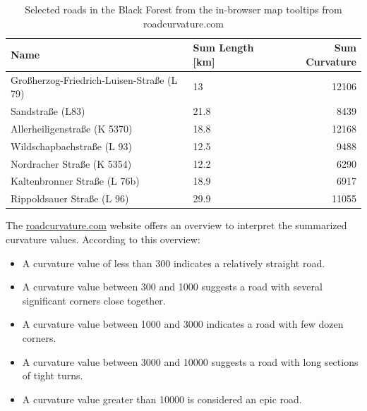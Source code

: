     \begin{table}
    \centering
    \begin{tabular}{@{}llr@{}} \toprule
        Name                                      & Sum Length [km] & Sum Curvature \\ \midrule
        Großherzog-Friedrich-Luisen-Straße (L 79) & 13              & 12106         \\
        Sandstraße (L83)                          & 21.8            & 8439          \\
        Allerheiligenstraße (K 5370)              & 18.8            & 12168         \\
        Wildschapbachstraße (L 93)                & 12.5            & 9488          \\
        Nordracher Straße (K 5354)                & 12.2            & 6290          \\
        Kaltenbronner Straße (L 76b)              & 18.9            & 6917          \\
        Rippoldsauer Straße (L 96)              & 29.9              & 11055         \\\bottomrule
    \end{tabular}
    \caption{Selected roads in the Black Forest from the in-browser map tooltips from roadcurvature.com} 
    \label{tab:roadsample}
    \end{table}

The \hyperlink{https://roadcurvature.com}{roadcurvature.com} website offers an overview to interpret the summarized curvature values. According to this overview:
\begin{itemize}
    \item A curvature value of less than 300 indicates a relatively straight road.
    \item A curvature value between 300 and 1000 suggests a road with several significant corners close together.
    \item A curvature value between 1000 and 3000 indicates a road with few dozen corners.
    \item A curvature value between 3000 and 10000 suggests a road with long sections of tight turns.
    \item A curvature value greater than 10000 is considered an epic road.
\end{itemize}


